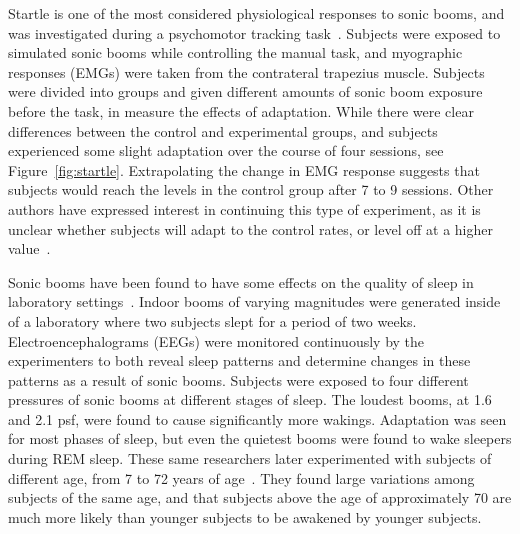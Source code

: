 \documentclass[]{aiaa-tc}%
\begin{document}
Startle is one of the most considered physiological responses to sonic booms, and was investigated during a psychomotor tracking task~\cite{lukas1968preliminary}. Subjects were exposed to simulated sonic booms while controlling the manual task, and myographic responses (EMGs) were taken from the contrateral trapezius muscle. Subjects were divided into groups and given different amounts of sonic boom exposure before the task, in measure the effects of adaptation. While there were clear differences between the control and experimental groups, and subjects experienced some slight adaptation over the course of four sessions, see Figure~\ref{fig:startle}. Extrapolating the change in EMG response suggests that subjects would reach the levels in the control group after 7 to 9 sessions. Other authors have expressed interest in continuing this type of experiment, as it is unclear whether subjects will adapt to the control rates, or level off at a higher value~\cite{von1972human}.

Sonic booms have been found to have some effects on the quality of sleep in laboratory settings~\cite{lukas1968preliminary}. Indoor booms of varying magnitudes were generated inside of a laboratory where two subjects slept for a period of two weeks. Electroencephalograms (EEGs) were monitored continuously by the experimenters to both reveal sleep patterns and determine changes in these patterns as a result of sonic booms. Subjects were exposed to four different pressures of sonic booms at different stages of sleep. The loudest booms, at 1.6 and 2.1 psf, were found to cause significantly more wakings. Adaptation was seen for most phases of sleep, but even the quietest booms were found to wake sleepers during REM sleep. These same researchers later experimented with subjects of different age, from 7 to 72 years of age~\cite{sixsubjects}. They found large variations among subjects of the same age, and that subjects above the age of approximately 70 are much more likely than younger subjects to be awakened by younger subjects.
\end{document}
